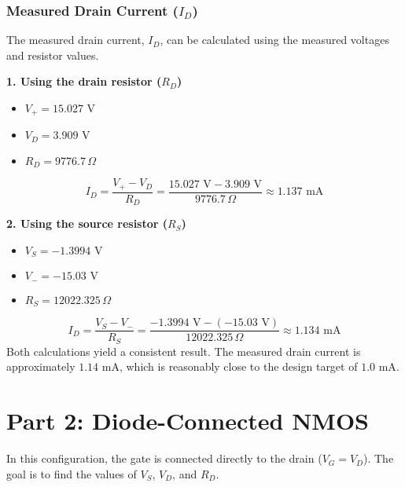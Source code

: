\documentclass{article}
\begin{document}
\subsubsection*{Measured Drain Current ($I_D$)} The measured drain current, $I_D$,
can be calculated using the measured voltages and resistor values.

\textbf{1. Using the drain resistor ($R_D$)}
\begin{itemize}
  \item
    $V_{+} = 15.027 \text{ V}$
  \item $V_D = 3.909 \text{ V}$
  \item $R_D = 9776.7 \,
    \Omega$
\end{itemize} $$ I_D = \frac{V_{+} - V_D}{R_D} = \frac{15.027 \text{ V}
- 3.909 \text{ V}}{9776.7 \, \Omega} \approx 1.137 \text{ mA} $$

\textbf{2. Using the source resistor ($R_S$)}
\begin{itemize}
  \item
    $V_S = -1.3994 \text{ V}$
  \item $V_{-} = -15.03 \text{ V}$
  \item $R_S = 12022.
    325 \, \Omega$
\end{itemize} $$ I_D = \frac{V_S - V_{-}}{R_S} = \frac{-1.3994
\text{ V} - (-15.03 \text{ V})}{12022.325 \, \Omega} \approx 1.134 \text{ mA} $$
Both calculations yield a consistent result. The measured drain current is
approximately \textbf{$1.14 \text{ mA}$}, which is reasonably close to the
design target of $1.0 \text{ mA}$.

\newpage

\section*{Part 2: Diode-Connected NMOS}
In this configuration, the gate is connected directly to the drain ($V_G = V_D$). The goal is to find the values of $V_S$, $V_D$, and $R_D$.
\end{document}
